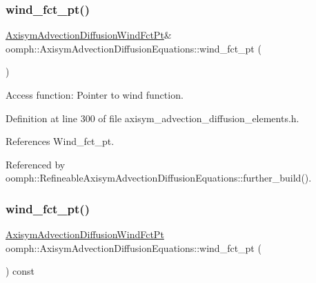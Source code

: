 \subsubsection{\texorpdfstring{wind\+\_\+fct\+\_\+pt()}{wind\_fct\_pt()}\hspace{0.1cm}{\footnotesize\ttfamily [1/2]}}
{\footnotesize\ttfamily \hyperlink{classoomph_1_1AxisymAdvectionDiffusionEquations_a53ee8d4a13b53896d66020591a8224b0}{Axisym\+Advection\+Diffusion\+Wind\+Fct\+Pt}\& oomph\+::\+Axisym\+Advection\+Diffusion\+Equations\+::wind\+\_\+fct\+\_\+pt (\begin{DoxyParamCaption}{ }\end{DoxyParamCaption})\hspace{0.3cm}{\ttfamily [inline]}}



Access function\+: Pointer to wind function. 



Definition at line 300 of file axisym\+\_\+advection\+\_\+diffusion\+\_\+elements.\+h.



References Wind\+\_\+fct\+\_\+pt.



Referenced by oomph\+::\+Refineable\+Axisym\+Advection\+Diffusion\+Equations\+::further\+\_\+build().

\mbox{\label{classoomph_1_1AxisymAdvectionDiffusionEquations_ab3b0dcb5dd4d30914b34c4628fe45288}} 
\subsubsection{\texorpdfstring{wind\+\_\+fct\+\_\+pt()}{wind\_fct\_pt()}\hspace{0.1cm}{\footnotesize\ttfamily [2/2]}}
{\footnotesize\ttfamily \hyperlink{classoomph_1_1AxisymAdvectionDiffusionEquations_a53ee8d4a13b53896d66020591a8224b0}{Axisym\+Advection\+Diffusion\+Wind\+Fct\+Pt} oomph\+::\+Axisym\+Advection\+Diffusion\+Equations\+::wind\+\_\+fct\+\_\+pt (\begin{DoxyParamCaption}{ }\end{DoxyParamCaption}) const\hspace{0.3cm}{\ttfamily [inline]}}



